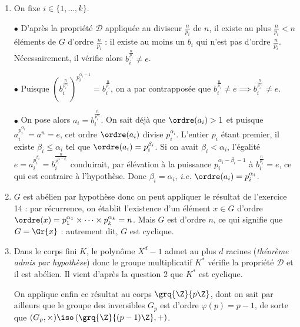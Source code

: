 \begin{enumerate}
 \item On fixe $i\in \{1,\ldots, k\}$.

 $\bullet$ D'après la propriété $\mathcal{D}$ appliquée au diviseur $\frac{n}{p_i}$ de $n$, il existe au plus $\frac{n}{p_i}<n$ éléments de $G$ d'ordre $\frac{n}{p_i}$ : il existe au moins un $b_i$ qui n'est pas d'ordre $\frac{n}{p_i}$. Nécessairement, il vérifie alors $b_i^{\frac{n}{p_i}}\neq e$.

 $\bullet$ Puisque $\left(b_i^{\frac{n}{p_i^{\alpha_i}}} \right)^{p_i^{\alpha_i-1}} = b_i^{\frac{n}{p_i}}$, on a par contrapposée que
 $b_i^{\frac{n}{p_i}}\neq e \implies b_i^{\frac{n}{p_i^{\alpha_i}}} \neq e$.

 $\bullet$ On pose alors $a_i = b_i^{\frac{n}{p_i^{\alpha_i}}}$. On sait déjà que $\ordre(a_i)>1$ et puisque $a_i^{p_i^{\alpha_i}} = a^n = e$, cet ordre $\ordre(a_i)$ divise $p_i^{\alpha_i}$. L'entier $p_i$ étant premier, il existe $\beta_i \leqslant \alpha_i$ tel que $\ordre(a_i) = p_i^{\beta_i}$. Si on avait $\beta_i<\alpha_i$, l'égalité $e = a_i^{p_i^{\beta_i}} = b_i^{\frac{n}{p_i^{\alpha_i-\beta_i}}}$ conduirait, par élévation à la puissance $p_i^{\alpha_i-\beta_i-1}$ à $b_i^{\frac{n}{p_i}} = e$, ce qui est contraire à l'hypothèse. Donc $\beta_i = \alpha_i$, \textit{i.e.} $\ordre(a_i) = p_i^{\alpha_i}$.

 \item $G$ est abélien par hypothèse donc on peut appliquer le résultat de l'exercice 14 : par récurrence, on établit l'existence d'un élément $x\in G$ d'ordre $\ordre(x) = p_1^{\alpha_1}\times \cdots \times p_k^{\alpha_k} = n$. Mais $G$ est d'ordre $n$, ce qui signifie que $G = \Gr{x}$ : autrement dit, $G$ est cyclique.

 \item Dans le corps fini $K$, le polynôme $X^d-1$ admet au plus $d$ racines (\emph{théorème admis par hypothèse}) donc le groupe multiplicatif $K^*$ vérifie la propriété $\mathcal{D}$ et il est abélien. Il vient d'après la question 2 que $K^*$ est cyclique.

 On applique enfin ce résultat au corps $\grq{\Z}{p\Z}$, dont on sait par ailleurs que le groupe des inversibles $G_p$ est d'ordre $\varphi(p) = p-1$, de sorte que $(G_p,\times) \iso \left(\grq{\Z}{(p-1)\Z},+\right)$.
\end{enumerate}


